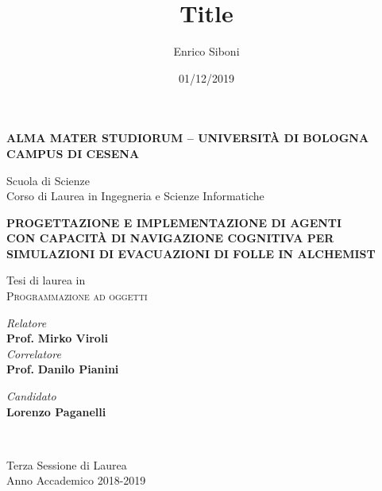 \title{Title}
\author{Enrico Siboni}
\date{01/12/2019}

\begin{titlepage}
	\begin{center}
		
		\large
		\textbf{ALMA MATER STUDIORUM -- UNIVERSITÀ DI BOLOGNA \\ CAMPUS DI CESENA}
		\\
		\noindent\hrulefill
		\vspace{0.4cm}
		
		\Large
		Scuola di Scienze \\
		Corso di Laurea in Ingegneria e Scienze Informatiche
		
		\vspace{4cm}
		\begin{center}
        {\large{\bf PROGETTAZIONE E IMPLEMENTAZIONE DI AGENTI}}\\
        \vspace{2mm}
        {\large{\bf CON CAPACITÀ DI NAVIGAZIONE COGNITIVA PER}}\\
        \vspace{2mm}
        {\large{\bf SIMULAZIONI DI EVACUAZIONI DI FOLLE IN ALCHEMIST}}\\
        \end{center}
		
		\large
		\vspace{1cm}
		Tesi di laurea in 
		\\
		\textsc{Programmazione ad oggetti}
		
		\vspace{5.5cm}
		\begin{minipage}[t]{0.64\textwidth}
			\begin{flushleft}
				\textit{Relatore} 
				\\ 
				\textbf{Prof.} \textbf{Mirko Viroli}
				\\
				\vspace{0.4cm}
				\textit{Correlatore} 
				\\
				\textbf{Prof.} \textbf{Danilo Pianini}
			\end{flushleft}
		\end{minipage}
		\begin{minipage}[t]{0.34\textwidth}
			\begin{flushright}
				\textit{Candidato} 
				\\ 
				\textbf{Lorenzo Paganelli}
			\end{flushright}
		\end{minipage}\\
		
		\vfill
		\noindent\hrulefill
		\vspace{0.3cm}
		\Large
		
		Terza Sessione di Laurea
		\\
		Anno Accademico 2018-2019
	\end{center}
\end{titlepage}
\restoregeometry